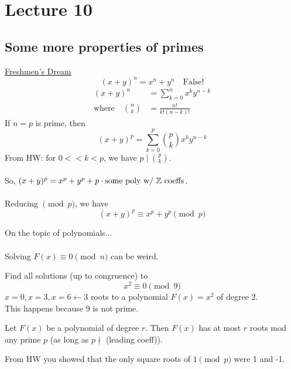 \chapter{Lecture 10}
\date{September 26, 2024}

\section{Some more properties of primes}
    \underline{Freshmen's Dream}
    \[ (x+y)^n = x^n + y^n \quad\text{False!} \]
    \begin{align*}
        (x+y)^n &= \sum_{k=0}^{n}x^k y^{n-k} \\
        \text{where}\quad {n\choose k} &= \frac{n!}{k!(n-k)!}
    \end{align*}
    If $n=p$ is prime, then
    \[ (x+y)^p = \sum_{k=0}^{p}{p\choose k}x^k y^{n-k} \]
    From HW: for $0<<k<p$, we have $p\mid {p\choose k}$. \\\\
    So, $(x+y)^p = x^p + y^p + p\cdot\text{some poly w/ } \mathbb{Z} \text{ coeffs}$. \\\\
    Reducing $\pmod{p}$, we have 
    \[ (x+y)^p\equiv x^p+y^p\pmod{p} \]

    On the topic of polynomials$\dots$ \\\\
    Solving $F(x)\equiv 0\pmod{n}$ can be weird. \\
    \begin{example}
        Find all solutions (up to congruence) to 
        \[ x^2\equiv 0\pmod{9} \]
        $x=0, x=3, x=6 \leftarrow 3$ roots to a polynomial $F(x)=x^2$ 
        of degree 2. \\
        This happens because 9 is not prime.
    \end{example}

    \begin{theorem}
        Let $F(x)$ be a polynomial of degree $r$. 
        Then $F(x)$ has at most $r$ roots mod any prime $p$
        (as long as $p\nmid$ (leading coeff)).
        \begin{example}
            From HW you showed that the only square roots of $1\pmod{p}$ 
            were 1 and -1.
        \end{example}
    \end{theorem}

\newpage
